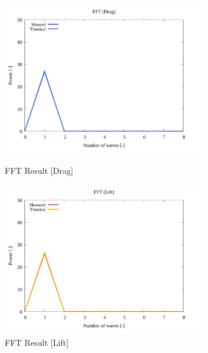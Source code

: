 \documentclass[twocolumn,a4j]{jsarticle}
\begin{document}
\newpage

\begin{figure}[htbp]
    \footnotesize
    \begin{center}
        \includegraphics[width=88mm]{../images_2/27/27-3_fft-drag_summary.png}
        \caption{FFT Result [Drag]}
        \includegraphics[width=88mm]{../images_2/27/27-4_fft-lift_summary.png}
        \caption{FFT Result [Lift]}
    \end{center}
\end{figure}
\end{document}

